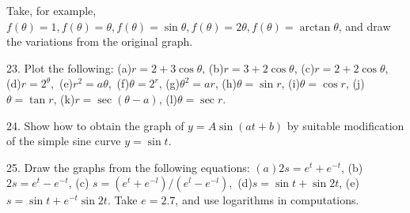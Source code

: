 \documentclass[12pt]{article}
\begin{document}
Take, for example, $f(\theta)=1, f(\theta)=\theta, f(\theta)=\sin\theta, f(\theta)=2\theta, f(\theta)
= \arctan\theta$, and draw the variations from the original graph.

23. Plot the following: (a)$r=2+3\cos\theta$, (b)$r=3+2\cos\theta$, 
(c)$r=2+2\cos\theta$, (d)$r=2^{\theta}$,\ (e)$r^{2}=a\theta$,\ (f)$\theta=2^r$, (g)$\theta^2=ar$,
(h)$\theta=\sin r$, (i)$\theta=\cos r$, (j)$\theta=\tan r$, (k)$r=\sec(\theta-a)$, (l)$\theta=\sec r$.

24. Show how to obtain the graph of $y=A\sin(at+b)$ by suitable
modification of the simple sine curve $y=\sin t$.

25. Draw the graphs from the following equations: $(a)2s=e^{t}+e^{-t}$,
(b)$ 2s=e^{t}-e^{-t}$, (c) $s=(e^{t}+e^{-l})/(e^{l}-e^{-l})$,\ (d)$s=\sin t+\sin 2t$,
(e)$s=\sin t+e^{-t} \sin 2t$. Take $e=2.7$, and use logarithms in computations.
\end{document}
